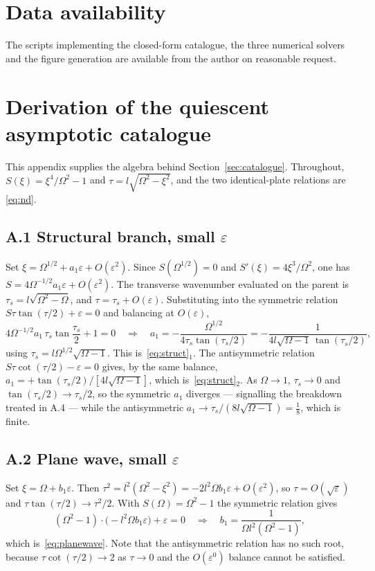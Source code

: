 \documentclass[11pt,a4paper]{article}
\newcommand{\Om}{\Omega}
\newcommand{\eps}{\varepsilon}
\theoremstyle{plain}
\theoremstyle{remark}
\begin{document}
\section*{Data availability}
The scripts implementing the closed-form catalogue, the three numerical solvers and the figure
generation are available from the author on reasonable request.

\appendix

\section{Derivation of the quiescent asymptotic catalogue}\label{app:catalogue}

This appendix supplies the algebra behind Section~\ref{sec:catalogue}. Throughout,
$S(\xi)=\xi^4/\Om^2-1$ and $\tau=l\sqrt{\Om^2-\xi^2}$, and the two identical-plate relations are
\eqref{eq:nd}.

\subsection*{A.1 Structural branch, small $\eps$}
Set $\xi=\Om^{1/2}+a_1\eps+O(\eps^2)$. Since $S(\Om^{1/2})=0$ and
$S'(\xi)=4\xi^3/\Om^2$, one has $S=4\Om^{-1/2}a_1\eps+O(\eps^2)$. The transverse wavenumber evaluated
on the parent is $\tau_s=l\sqrt{\Om^2-\Om}$, and $\tau=\tau_s+O(\eps)$. Substituting into the
symmetric relation $S\tau\tan(\tau/2)+\eps=0$ and balancing at $O(\eps)$,
\begin{equation}
4\Om^{-1/2}a_1\,\tau_s\tan\frac{\tau_s}{2}+1=0
\quad\Longrightarrow\quad
a_1=-\frac{\Om^{1/2}}{4\tau_s\tan(\tau_s/2)}
=-\frac{1}{4l\sqrt{\Om-1}\,\tan(\tau_s/2)},
\end{equation}
using $\tau_s=l\Om^{1/2}\sqrt{\Om-1}$. This is~\eqref{eq:struct}$_1$. The antisymmetric relation
$S\tau\cot(\tau/2)-\eps=0$ gives, by the same balance,
$a_1=+\tan(\tau_s/2)/[4l\sqrt{\Om-1}]$, which is~\eqref{eq:struct}$_2$. As $\Om\to1$, $\tau_s\to0$ and
$\tan(\tau_s/2)\to\tau_s/2$, so the symmetric $a_1$ diverges --- signalling the breakdown treated in
A.4 --- while the antisymmetric $a_1\to\tau_s/(8l\sqrt{\Om-1})=\tfrac18$, which is finite.

\subsection*{A.2 Plane wave, small $\eps$}
Set $\xi=\Om+b_1\eps$. Then $\tau^2=l^2(\Om^2-\xi^2)=-2l^2\Om b_1\eps+O(\eps^2)$, so $\tau=O(\sqrt\eps)$
and $\tau\tan(\tau/2)\to\tau^2/2$. With $S(\Om)=\Om^2-1$ the symmetric relation gives
\begin{equation}
(\Om^2-1)\cdot\bigl(-l^2\Om b_1\eps\bigr)+\eps=0
\quad\Longrightarrow\quad
b_1=\frac{1}{\Om l^2(\Om^2-1)},
\end{equation}
which is~\eqref{eq:planewave}. Note that the antisymmetric relation has no such root, because
$\tau\cot(\tau/2)\to2$ as $\tau\to0$ and the $O(\eps^0)$ balance cannot be satisfied.
\end{document}
